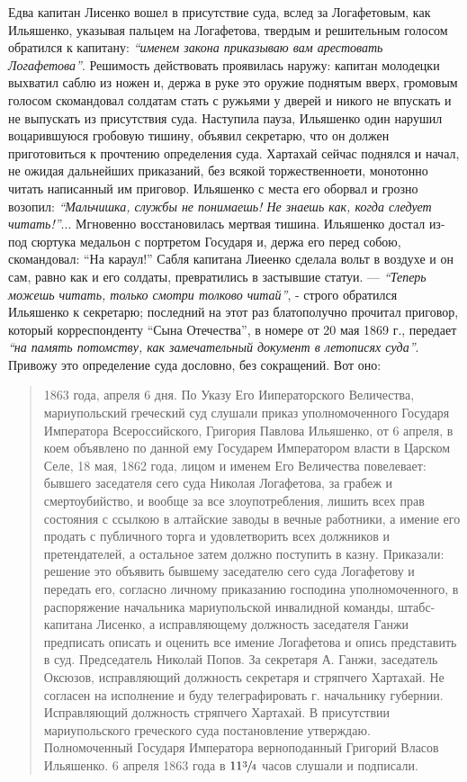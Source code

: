 \documentclass[a4paper,20pt]{report}
\begin{document}
Едва капитан Лисенко вошел в присутствие суда,
вслед за Логафетовым, как Ильяшенко, указывая пальцем на 
Логафетова, твердым и решительным голосом
обратился к капитану: \emph{``именем закона приказываю вам
арестовать Логафетова''}. Решимость действовать проявилась
наружу: капитан молодецки выхватил саблю из ножен
и, держа в руке это оружие поднятым вверх, громовым
голосом скомандовал солдатам стать с ружьями у дверей
и никого не впускать и не выпускать из присутствия
суда. Наступила пауза, Ильяшенко один нарушил воцарившуюся 
гробовую тишину, объявил секретарю, что он
должен приготовиться к прочтению определения суда. Хартахай сейчас 
поднялся и начал, не ожидая дальнейших
приказаний, без всякой торжественноети, монотонно читать
написанный им приговор. Ильяшенко с места его оборвал 
и грозно возопил: \emph{``Мальчишка, службы не понимаешь!
Не знаешь как, когда следует читать!''}... Мгновенно восстановилась 
мертвая тишина. Ильяшенко достал из-под
сюртука медальон с портретом Государя и, держа его
перед собою, скомандовал: ``На караул!'' Сабля капитана
Лиеенко сделала вольт в воздухе и он сам, равно как
и его солдаты, превратились в застывшие статуи. — \emph{``Теперь
можешь читать, только смотри толково читай''}, - строго обратился
Ильяшенко к секретарю; последний на этот раз
блатополучно прочитал приговор, который корреспонденту
``Сына Отечества'', в номере от 20 мая 1869 г., передает \emph{``на память потомству, как замечательный документ
в летописях суда''}. Привожу это определение суда дословно, без сокращений. Вот оно:
\begin{quote}
\em\bfseries
	
1863 года, апреля 6 дня. По Указу Его Ииператорского Величества, мариупольский греческий суд слушали
приказ уполномоченного Государя Императора Всероссийского,
Григория Павлова Ильяшенко, от 6 апреля, в коем объявлено 
по данной ему Государем Императором власти в
Царском Селе, 18 мая, 1862 года, лицом и именем
Его Величества повелевает: бывшего заседателя сего суда
Николая Логафетова, за грабеж и смертоубийство, и вообще
за все злоупотребления, лишить всех прав состояния с
ссылкою в алтайские заводы в вечные работники, а имение
его продать с публичного торга и удовлетворить всех
должников и претендателей, а остальное затем должно
поступить в казну. Приказали: решение это объявить бывшему заседателю сего суда 
Логафетову и передать его, согласно личному приказанию господина уполномоченного, в
распоряжение начальника мариупольской инвалидной команды,
штабс-капитана Лисенко, а исправляющему должность заседателя Ганжи 
предписать описать и оценить все имение
Логафетова и опись представить в суд. Председатель Николай Попов. 
За секретаря А. Ганжи, заседатель Оксюзов,
исправляющий должность секретаря и стряпчего Хартахай.
Не согласен на исполнение и буду телеграфировать г. начальнику губернии. 
Исправляющий должность стряпчего Хартахай. В присутствии мариупольского греческого суда постановление 
утверждаю. Полномоченный Государя Императора
верноподанный Григорий Власов Ильяшенко. 6 апреля 1863
года в $11 \sfrac{3}{4}$ часов слушали и подписали.

\end{quote}
\end{document}
